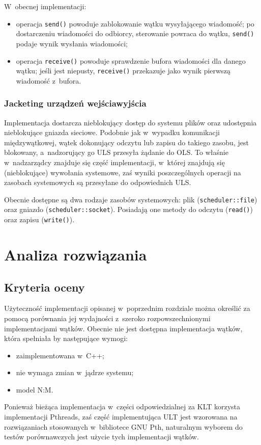 \documentclass[11pt,makeidx]{mwart}
\newcommand{\code}{\texttt}
\newcommand{\dcolon}{::}
\newcommand{\procbr}{()}
\begin{document}
	W~obecnej implementacji:
	\begin{itemize}
		\item operacja \code{send\procbr} powoduje zablokowanie wątku wysyłającego wiadomość; po dostarczeniu wiadomości do odbiorcy, 
			sterowanie powraca do wątku, \code{send\procbr} podaje wynik wysłania wiadomości;
		\item operacja \code{receive\procbr} powoduje sprawdzenie bufora wiadomości dla danego wątku; jeśli jest niepusty, \code{receive\procbr}
			przekazuje jako wynik pierwszą wiadomość z~bufora.
	\end{itemize}
\par
%
\subsubsection{Jacketing urządzeń wejścia\dywiz wyjścia}
\indent
	Implementacja dostarcza nieblokujący dostęp do systemu plików oraz udostępnia nieblokujące gniazda sieciowe.
	Podobnie jak w~wypadku komunikacji międzywątkowej, wątek dokonujący odczytu lub zapisu do takiego zasobu, jest blokowany,
	a~nadzorujący go ULS przesyła żądanie do OLS.
	To właśnie w~nad\dywiz zarządcy znajduje się część implementacji, w~której znajdują się (nieblokujące) wywołania systemowe,
	zaś wyniki poszczególnych operacji na zasobach systemowych są przesyłane do odpowiednich ULS.
\par
%
\indent
	Obecnie dostępne są dwa rodzaje zasobów systemowych: plik \linebreak (\code{scheduler\dcolon file}) oraz gniazdo (\code{scheduler\dcolon socket}).
	Posiadają one metody do odczytu (\code{read\procbr}) oraz zapisu (\code{write\procbr}).
\par
%
\newpage
\section{Analiza rozwiązania}
\label{sec:analysis}
\subsection{Kryteria oceny}
\indent
	Użyteczność implementacji opisanej w~poprzednim rozdziale można określić za pomocą porównania jej wydajności z~szeroko rozpowszechnionymi
	implementacjami wątków. Obecnie nie jest dostępna implementacja wątków, która spełniała by następujące wymogi:
	\begin{itemize}
		\item zaimplementowana w~C++;
		\item nie wymaga zmian w~jądrze systemu;
		\item model N:M.
	\end{itemize}
	Ponieważ bieżąca implementacja w~części odpowiedzialnej za KLT korzysta implementacji Pthreads, zaś część implementująca ULT
	jest wzorowana na rozwiązaniach stosowanych w~bibliotece GNU Pth, naturalnym wyborem do testów porównawczych jest
	użycie tych implementacji wątków.
\par
%
\end{document}
